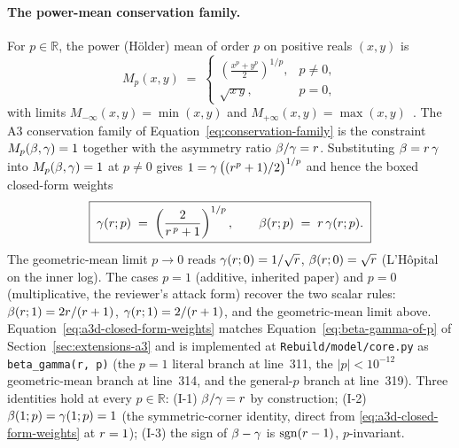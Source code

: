 \paragraph{The power-mean conservation family.}
For $p \in \mathbb{R}$, the power (Hölder) mean of order $p$ on
positive reals $(x, y)$ is
\begin{equation}
  M_p(x, y) \;=\;
  \begin{cases}
    \displaystyle \left( \frac{x^p + y^p}{2} \right)^{1/p}, & p \ne 0, \\[4pt]
    \displaystyle \sqrt{x\,y}, & p = 0,
  \end{cases}
  \label{eq:a3d-power-mean}
\end{equation}
with limits $M_{-\infty}(x, y) = \min(x, y)$ and
$M_{+\infty}(x, y) = \max(x, y)$~\cite{HLP1934}. The A3
conservation family of Equation~\eqref{eq:conservation-family} is
the constraint $M_p(\beta, \gamma) = 1$ together with the
asymmetry ratio $\beta/\gamma = r$. Substituting
$\beta = r\,\gamma$ into $M_p(\beta, \gamma) = 1$ at
$p \ne 0$ gives
$1 = \gamma\,\bigl((r^p + 1)/2\bigr)^{1/p}$ and hence the boxed
closed-form weights
\begin{equation}
  \boxed{\;
    \gamma(r; p) \;=\;
    \left( \frac{2}{r^{\,p} + 1} \right)^{1/p},
    \qquad
    \beta(r; p) \;=\;
    r\,\gamma(r; p).
  \;}
  \label{eq:a3d-closed-form-weights}
\end{equation}
The geometric-mean limit $p \to 0$ reads
$\gamma(r; 0) = 1/\sqrt{r}$,
$\beta(r; 0) = \sqrt{r}$ (L'Hôpital on the inner log).
The cases $p = 1$ (additive, inherited paper) and $p = 0$
(multiplicative, the reviewer's attack form) recover the two scalar
rules: $\beta(r; 1) = 2r/(r + 1)$,
$\gamma(r; 1) = 2/(r + 1)$, and the geometric-mean limit
above. Equation~\eqref{eq:a3d-closed-form-weights} matches
Equation~\eqref{eq:beta-gamma-of-p} of
Section~\ref{sec:extensions-a3} and is implemented at
\texttt{Rebuild/model/core.py} as
\texttt{beta\_gamma(r, p)} (the $p = 1$ literal branch at line~311,
the $|p| < 10^{-12}$ geometric-mean branch at line~314, and the
general-$p$ branch at line~319). Three identities hold at every
$p \in \mathbb{R}$: (I-1) $\beta/\gamma = r$ by
construction; (I-2) $\beta(1; p) = \gamma(1; p) = 1$ (the
symmetric-corner identity, direct from
\eqref{eq:a3d-closed-form-weights} at $r = 1$); (I-3) the
sign of $\beta - \gamma$ is $\operatorname{sgn}(r - 1)$,
$p$-invariant.

